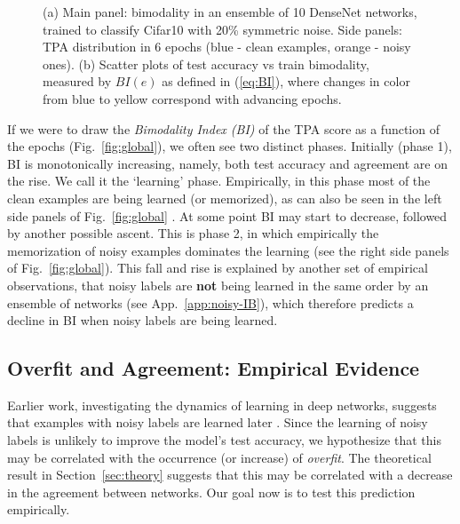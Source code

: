 \documentclass{article}
\begin{document}
\begin{figure}[ht]
\begin{center}
\begin{subfigure}{0.96\textwidth}
{{\begin{subfigure}{0.25\textwidth}
  \vspace{-0.45cm}
  \caption{}
  \label{subfig:biaccsym}
  \end{subfigure}
\cr
}
}
\end{subfigure}
\vspace{-1em}
\caption{(a) Main panel: bimodality in an ensemble of 10 DenseNet networks, trained to classify Cifar10 with 20\% symmetric noise. Side panels: TPA distribution in 6 epochs (blue - clean examples, orange - noisy ones). (b) Scatter plots of test accuracy vs train bimodality, measured by $BI(e)$ as defined in (\ref{eq:BI}), where changes in color from blue to yellow correspond with advancing epochs.}
\end{center}
\end{figure}

If we were to draw the \emph{Bimodality Index (BI)} of the TPA score as a function of the epochs (Fig.~\ref{fig:global}), we often see two distinct phases. Initially (phase 1), BI is monotonically increasing, namely, both test accuracy and agreement are on the rise. We call it the ‘learning’ phase. Empirically, in this phase most of the clean examples are being learned (or memorized), as can also be seen in the left side panels of Fig.~\ref{fig:global} %
\citep[cf.][]{li2015convergent}. At some point BI may start to decrease, followed by another possible ascent. This is phase 2, in which empirically the memorization of noisy examples dominates the learning (see the right side panels of Fig.~\ref{fig:global}). This fall and rise is explained by another set of empirical observations, that noisy labels are \textbf{not} being learned in the same order by an ensemble of networks (see App.~\ref{app:noisy-IB}), which therefore predicts a decline in BI when noisy labels are being learned. 



\subsection{Overfit and Agreement: Empirical Evidence}
\label{sec:overfit-empical}

Earlier work, investigating the dynamics of learning in deep networks, suggests that examples with noisy labels are learned later \citep{KruegerBJAKMBFC17,zhang2017ICLR,arpit2017closer,arora2019fine}. Since the learning of noisy labels is unlikely to improve the model's test accuracy, we hypothesize that this may be correlated with the occurrence (or increase) of \emph{overfit}. The theoretical result in Section~\ref{sec:theory} suggests that this may be correlated with a decrease in the agreement between networks. Our goal now is to test this prediction empirically.
\end{document}
